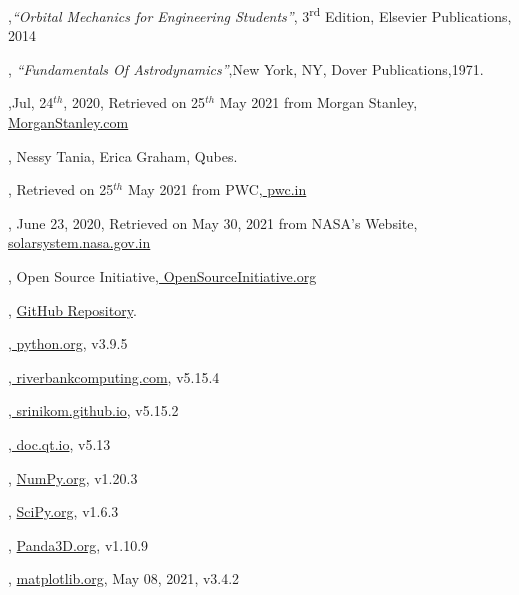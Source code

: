 \documentclass[12pt]{article}
\begin{document}
\begin{thebibliography}{99}
	,{\textit{\enquote{Orbital Mechanics for Engineering Students}}},{ 3\textsuperscript{rd} Edition}, { Elsevier Publications},{ 2014}	
	
	,{ \textit{\enquote{Fundamentals Of Astrodynamics}}},{New York, NY},{ Dover Publications},{1971}.
	
	,{Jul, 24$^{th}$, 2020}, { Retrieved on 25$^{th}$ May 2021 from Morgan Stanley},{\href{https://www.morganstanley.com/ideas/investing-in-space}{ MorganStanley.com}}
	
	,{ Nessy Tania, Erica Graham}, {Qubes.}
	
	,{ Retrieved on 25$^{th}$ May 2021 from PWC},{\href{https://www.pwc.in/research-insights/2020/preparing-to-scale-new-heights.html}{ pwc.in}}
	
	, { June 23, 2020}, { Retrieved on May 30, 2021 from NASA's Website}, {\href{https://solarsystem.nasa.gov/resources/754/what-is-a-lagrange-point/}{solarsystem.nasa.gov.in}}
	
	,{ Open Source Initiative},{\href{https://opensource.org/licenses/gpl-3.0.html}{ OpenSourceInitiative.org}}

	, {\href{https://github.com/iamlrk/MOPy}{GitHub Repository}}.
	
	,{\href{https://docs.python.org}{ python.org}},{ v3.9.5}
	
	,{\href{https://www.riverbankcomputing.com/static/Docs/PyQt5/}{ riverbankcomputing.com}},{ v5.15.4}
	
	,{\href{https://srinikom.github.io/pyside-docs/pysideapi2.html}{ srinikom.github.io}},{ v5.15.2}
	
	,{\href{https://doc.qt.io/qt-5/qtdesigner-manual.html}{ doc.qt.io}},{ v5.13}
	
	, {\href{https://numpy.org/doc}{ NumPy.org}},{ v1.20.3}
	
	, {\href{https://scipy.org/doc}{ SciPy.org}},{ v1.6.3}
	
	, {\href{https://docs.panda3d.org/1.10/python/index}{ Panda3D.org}},{ v1.10.9}
	
	, {\href{https://matplotlib.org/stable/contents.html}{ matplotlib.org}}, {May 08, 2021}, { v3.4.2}
	
\end{thebibliography}
\end{document}
